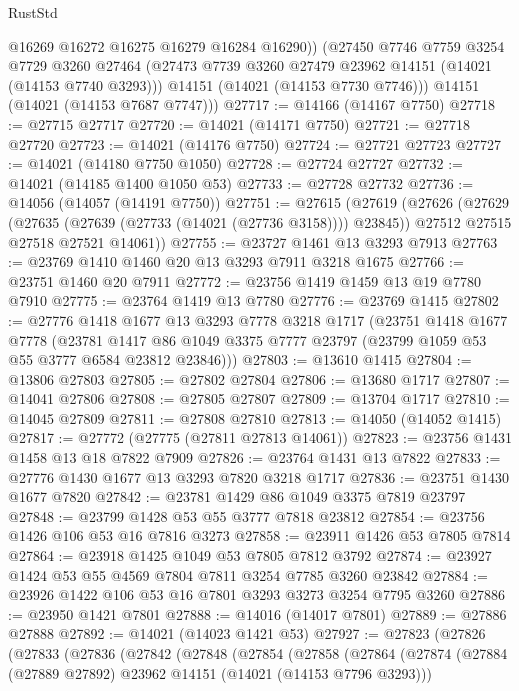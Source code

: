 \begin{lexlean}{RustStd}
\begin{coremodule}
          @16269
          @16272
          @16275
          @16279
          @16284
          @16290))
      (@27450
        @7746
        @7759
        @3254
        @7729
        @3260
        @27464
        (@27473 @7739 @3260 @27479 @23962 @14151 (@14021 (@14153 @7740 @3293)))
        @14151
        (@14021 (@14153 @7730 @7746)))
      @14151
      (@14021 (@14153 @7687 @7747)))
@27717 := @14166 (@14167 @7750)
@27718 := @27715 @27717
@27720 := @14021 (@14171 @7750)
@27721 := @27718 @27720
@27723 := @14021 (@14176 @7750)
@27724 := @27721 @27723
@27727 := @14021 (@14180 @7750 @1050)
@27728 := @27724 @27727
@27732 := @14021 (@14185 @1400 @1050 @53)
@27733 := @27728 @27732
@27736 := @14056 (@14057 (@14191 @7750))
@27751 := @27615
    (@27619
      (@27626
        (@27629 (@27635 (@27639 (@27733 (@14021 (@27736 @3158)))) @23845))
        @27512
        @27515
        @27518
        @27521
        @14061))
@27755 := @23727 @1461 @13 @3293 @7913
@27763 := @23769 @1410 @1460 @20 @13 @3293 @7911 @3218 @1675
@27766 := @23751 @1460 @20 @7911
@27772 := @23756 @1419 @1459 @13 @19 @7780 @7910
@27775 := @23764 @1419 @13 @7780
@27776 := @23769 @1415
@27802 := @27776
    @1418
    @1677
    @13
    @3293
    @7778
    @3218
    @1717
    (@23751
      @1418
      @1677
      @7778
      (@23781 @1417 @86 @1049 @3375 @7777 @23797 (@23799 @1059 @53 @55 @3777 @6584 @23812 @23846)))
@27803 := @13610 @1415
@27804 := @13806 @27803
@27805 := @27802 @27804
@27806 := @13680 @1717
@27807 := @14041 @27806
@27808 := @27805 @27807
@27809 := @13704 @1717
@27810 := @14045 @27809
@27811 := @27808 @27810
@27813 := @14050 (@14052 @1415)
@27817 := @27772 (@27775 (@27811 @27813 @14061))
@27823 := @23756 @1431 @1458 @13 @18 @7822 @7909
@27826 := @23764 @1431 @13 @7822
@27833 := @27776 @1430 @1677 @13 @3293 @7820 @3218 @1717
@27836 := @23751 @1430 @1677 @7820
@27842 := @23781 @1429 @86 @1049 @3375 @7819 @23797
@27848 := @23799 @1428 @53 @55 @3777 @7818 @23812
@27854 := @23756 @1426 @106 @53 @16 @7816 @3273
@27858 := @23911 @1426 @53 @7805 @7814
@27864 := @23918 @1425 @1049 @53 @7805 @7812 @3792
@27874 := @23927 @1424 @53 @55 @4569 @7804 @7811 @3254 @7785 @3260 @23842
@27884 := @23926 @1422 @106 @53 @16 @7801 @3293 @3273 @3254 @7795 @3260
@27886 := @23950 @1421 @7801
@27888 := @14016 (@14017 @7801)
@27889 := @27886 @27888
@27892 := @14021 (@14023 @1421 @53)
@27927 := @27823
    (@27826
      (@27833
        (@27836
          (@27842
            (@27848
              (@27854
                (@27858
                  (@27864
                    (@27874
                      (@27884 (@27889 @27892) @23962 @14151 (@14021 (@14153 @7796 @3293)))

\end{coremodule}
\end{lexlean}
